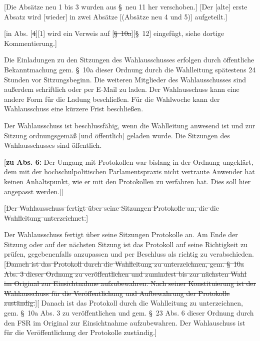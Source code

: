 \documentclass[%
draft,%
multilinesections%
]{fswo}
\newcommand\oldT[1]  {{\color{Gray}[\st{#1}]}}
\newcommand\newT[1]  {{\color{Green}[#1]}}
\newcommand\bemFr[1] {{\color{Red}[#1]}}
\newcommand\bemFe[1] {{\color{Cyan}[#1]}}
\newcommand\bemTi[1] {{\color{Cyan}[#1]}} %
\newcommand\oldT[1]{}%
\newcommand\newT[1]{#1}
\newcommand\bemFr[1]{}%
\newcommand\bemFe[1]{}%
\newcommand\bemTi[1]{}%
\newcommand\change[2]{\oldT{#1}\newT{#2}}
\begin{document}
\bemFe{Die Absätze neu 1 bis 3 wurden aus \S~neu 11 her verschoben.}
\bemFe{Der \bemTi{alte} erste Absatz wird \bemTi{wieder} in zwei Absätze \bemTi{(Absätze neu 4 und 5)} aufgeteilt.}
\begin{contract}
\begin{addmargin}{1cm}
\bemFr{in Abs. \change{4}{1} wird ein Verweis auf \change{\S~10a}{\S~12} eingefügt, siehe dortige Kommentierung.}
\end{addmargin}

Die Einladungen zu den Sitzungen des Wahlausschusses erfolgen durch öffentliche Bekanntmachung gem. \S~10a dieser Ordnung durch die Wahlleitung spätestens 24 Stunden vor Sitzungsbeginn.
Die weiteren Mitglieder des Wahlausschusses sind außerdem schriftlich oder per E-Mail zu laden.
Der Wahlausschuss kann eine andere Form für die Ladung beschließen.
Für die Wahlwoche kann der Wahlausschuss eine kürzere Frist beschließen.

Der Wahlausschuss ist beschlussfähig, wenn die Wahlleitung anwesend ist und zur Sitzung ordnungsgemäß \newT{und öffentlich} geladen wurde.
Die Sitzungen des Wahlausschusses sind öffentlich.
%
\begin{addmargin}{1cm}
\bemFr{\textbf{zu Abs. 6:}
Der Umgang mit Protokollen war bislang in der Ordnung ungeklärt,
dem mit der hochschulpolitischen Parlamentspraxis nicht vertraute Anwender hat keinen Anhaltspunkt, wie er mit den Protokollen zu verfahren hat.
Dies soll hier angepasst werden.]}
\end{addmargin}
%
\oldT{Der Wahlausschuss fertigt über seine Sitzungen Protokolle an, die die Wahlleitung unterzeichnet.}

Der Wahlausschuss fertigt über seine Sitzungen Protokolle an.
Am Ende der Sitzung oder auf der nächsten Sitzung ist das Protokoll auf seine Richtigkeit zu prüfen, gegebenenfalls anzupassen und per Beschluss als richtig zu verabschieden.
\change{Danach ist das Protokoll durch die Wahlleitung zu unterzeichnen,
gem. \S~10a Abs. 3 dieser Ordnung zu veröffentlichen und zumindest bis zur nächsten Wahl im Original zur Einsichtnahme aufzubewahren.
Nach seiner Konstituierung ist der Wahlausschuss für die Veröffentlichung und Aufbewahrung der Protokolle zuständig.}{%
Danach ist das Protokoll durch die Wahlleitung zu unterzeichnen,
gem. \S~10a Abs. 3 zu veröffentlichen und gem. \S~23 Abs. 6 dieser Ordnung durch den FSR im Original zur Einsichtnahme aufzubewahren.
Der Wahlauschuss ist für die Veröffentlichung der Protokolle zuständig.}


\end{contract}
\end{document}
